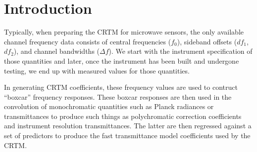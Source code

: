 \section{Introduction}

Typically, when preparing the CRTM for microwave sensors, the only available channel frequency data consists of central frequencies ($f_0$), sideband offsets ($df_1$,$df_2$), and channel bandwidths ($\Delta f$). We start with the instrument specification of those quantities and later, once the instrument has been built and undergone testing, we end up with measured values for those quantities.

In generating CRTM coefficients, these frequency values are used to contruct ``boxcar'' frequency responses. These boxcar responses are then used in the convolution of monochromatic quantities such as Planck radiances or transmittances to produce such things as polychromatic correction coefficients and instrument resolution transmittances. The latter are then regressed against a set of predictors to produce the fast transmittance model coefficients used by the CRTM.

